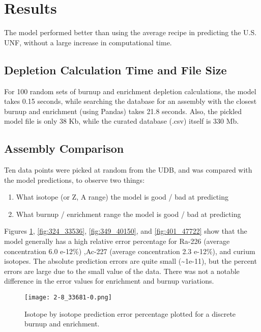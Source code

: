\section{Results}

The model performed better than using the average
recipe in predicting the U.S. \gls{UNF}, without
a large increase in computational time.


\subsection{Depletion Calculation Time and File Size}

For 100 random sets of
burnup and enrichment depletion calculations,
the model takes 0.15 seconds, while
searching the database for an assembly
with the closest burnup and enrichment (using Pandas)
takes 21.8 seconds. Also, the pickled model file is only
38 Kb, while the curated database (.csv) itself is 330 Mb.

\subsection{Assembly Comparison}

Ten data points were picked at random from the \gls{UDB},
and was compared with the model predictions, to observe
two things:
\begin{enumerate}
    \item What isotope (or Z, A range) the model is good / bad
        at predicting
    \item What burnup / enrichment range the model is good / bad
        at predicting
\end{enumerate}

Figures \ref{fig:28_33681}, \ref{fig:324_33536},
\ref{fig:349_40150}, and \ref{fig:401_47722}
show that the model
generally has a high relative error percentage for Ra-226
(average concentration 6.0 e-12\%) ,Ac-227 (average concentration  2.3 e-12\%), and curium isotopes.
The absolute prediction errors are quite small
(\textasciitilde 1e-11), but the percent errors are large due
to the small value of the data. There was not a notable
difference in the error values for enrichment
and burnup variations.

\begin{figure}
    \centering
    \texttt{[image: 2-8\_33681-0.png]}
    \caption{Isotope by isotope prediction error percentage
             plotted for a discrete burnup and enrichment.}
    \label{fig:28_33681}
\end{figure}



